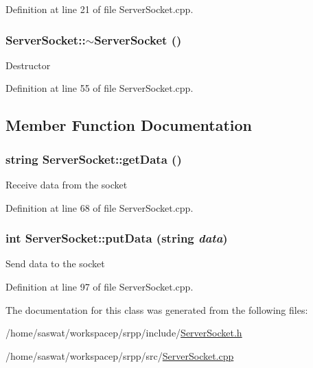 Definition at line 21 of file ServerSocket.cpp.

\hypertarget{class_server_socket_a510674d924c2544e6b0069e39c36516b}{
\subsubsection[{$\sim$ServerSocket}]{\setlength{\rightskip}{0pt plus 5cm}ServerSocket::$\sim$ServerSocket ()}}
\label{class_server_socket_a510674d924c2544e6b0069e39c36516b}
Destructor 

Definition at line 55 of file ServerSocket.cpp.



\subsection{Member Function Documentation}
\hypertarget{class_server_socket_a0369ddedee48f15d9cedb1c46d424ab2}{
\subsubsection[{getData}]{\setlength{\rightskip}{0pt plus 5cm}string ServerSocket::getData ()}}
\label{class_server_socket_a0369ddedee48f15d9cedb1c46d424ab2}
Receive data from the socket 

Definition at line 68 of file ServerSocket.cpp.

\hypertarget{class_server_socket_a11591e1eb5e51b3b199f846836486e13}{
\subsubsection[{putData}]{\setlength{\rightskip}{0pt plus 5cm}int ServerSocket::putData (string {\em data})}}
\label{class_server_socket_a11591e1eb5e51b3b199f846836486e13}
Send data to the socket 

Definition at line 97 of file ServerSocket.cpp.



The documentation for this class was generated from the following files:\begin{DoxyCompactItemize}
\item 
/home/saswat/workspacep/srpp/include/\hyperlink{_server_socket_8h}{ServerSocket.h}\item 
/home/saswat/workspacep/srpp/src/\hyperlink{_server_socket_8cpp}{ServerSocket.cpp}\end{DoxyCompactItemize}
